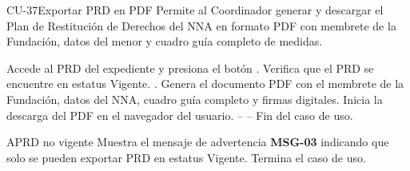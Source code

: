 \begin{UseCase}{CU-37}{Exportar PRD en PDF}{
	Permite al Coordinador generar y descargar el Plan de Restitución de Derechos del NNA en formato PDF con membrete de la Fundación, datos del menor y cuadro guía completo de medidas.
}
\end{UseCase}

\begin{UCtrayectoria}
	\UCpaso[\UCactor] Accede al PRD del expediente y presiona el botón .
	\UCpaso Verifica que el PRD se encuentre en estatus Vigente. .
	\UCpaso Genera el documento PDF con el membrete de la Fundación, datos del NNA, cuadro guía completo y firmas digitales.
	\UCpaso Inicia la descarga del PDF en el navegador del usuario.
	\UCpaso[] -- -- Fin del caso de uso.
\end{UCtrayectoria}

\begin{UCtrayectoriaA}{A}{PRD no vigente}
	\UCpaso Muestra el mensaje de advertencia \textbf{MSG-03} indicando que solo se pueden exportar PRD en estatus Vigente.
	\UCpaso Termina el caso de uso.
\end{UCtrayectoriaA}

